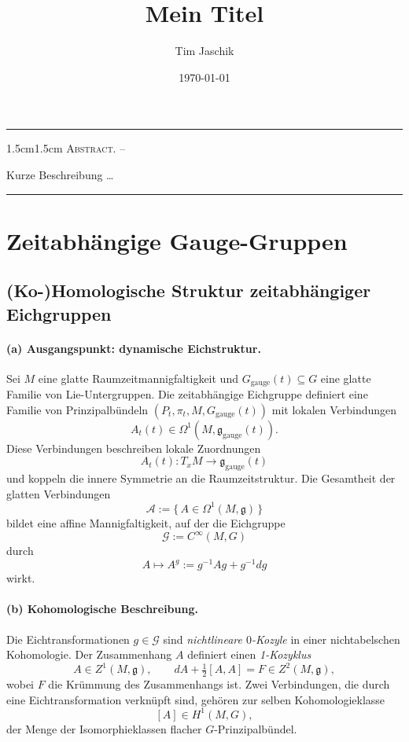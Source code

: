 \documentclass[10pt, letterpaper]{article}
\title{Mein Titel}
\author{Tim Jaschik}
\date{\today}
\renewenvironment{abstract}
  {
    \begin{adjustwidth}{1.5cm}{1.5cm}
    \small
    \textsc{Abstract. –}%
  }
  {
    \end{adjustwidth}
  }
\begin{document}
\maketitle
\rule{\textwidth}{0.5pt}
\begin{abstract}
Kurze Beschreibung …
\end{abstract}
\rule{\textwidth}{0.5pt}
\vspace{0.5cm}

\tableofcontents

\pagebreak


\section{Zeitabhängige Gauge-Gruppen}


\subsection{(Ko-)Homologische Struktur zeitabhängiger Eichgruppen}

\paragraph{(a) Ausgangspunkt: dynamische Eichstruktur.}
Sei $M$ eine glatte Raumzeitmannigfaltigkeit und
$G_\mathrm{gauge}(t)\subseteq G$ eine glatte Familie von Lie-Untergruppen.
Die zeitabhängige Eichgruppe definiert eine Familie von
Prinzipalbündeln $(P_t,\pi_t,M,G_\mathrm{gauge}(t))$
mit lokalen Verbindungen
\[
A_t(t)\in\Omega^1(M,\mathfrak g_\mathrm{gauge}(t)).
\]
Diese Verbindungen beschreiben lokale Zuordnungen
\[
A_t(t)\colon T_xM\to\mathfrak g_\mathrm{gauge}(t)
\]
und koppeln die innere Symmetrie an die Raumzeitstruktur.
Die Gesamtheit der glatten Verbindungen
\[
\mathcal A:=\{\,A\in\Omega^1(M,\mathfrak g)\,\}
\]
bildet eine affine Mannigfaltigkeit, auf der die Eichgruppe
\[
\mathcal G:=C^\infty(M,G)
\]
durch
\[
A\mapsto A^g:=g^{-1}Ag+g^{-1}dg
\]
wirkt.

\paragraph{(b) Kohomologische Beschreibung.}
Die Eichtransformationen $g\in\mathcal G$ sind
\emph{nichtlineare $0$-Kozyle} in einer nichtabelschen Kohomologie.
Der Zusammenhang $A$ definiert einen \emph{1-Kozyklus}
\[
A\in Z^1(M,\mathfrak g),
\qquad
dA+\tfrac12[A,A]=F\in Z^2(M,\mathfrak g),
\]
wobei $F$ die Krümmung des Zusammenhangs ist.
Zwei Verbindungen, die durch eine Eichtransformation verknüpft sind,
gehören zur selben Kohomologieklasse
\[
[A]\in H^1(M,G),
\]
der Menge der Isomorphieklassen flacher $G$-Prinzipalbündel.
\end{document}
